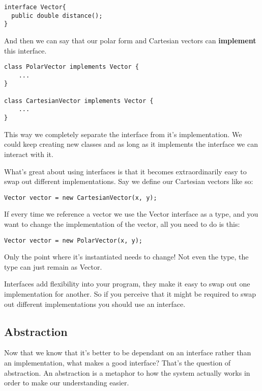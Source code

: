 \documentclass{article}
\begin{document}
  \begin{verbatim}
interface Vector{
  public double distance();
}
  \end{verbatim}

  And then we can say that our polar form and Cartesian vectors can \textbf{implement}
  this interface.

  \begin{verbatim}
class PolarVector implements Vector {
    ...
}

class CartesianVector implements Vector {
    ...
}
  \end{verbatim}

  This way we completely separate the interface from it's implementation. We
  could keep creating new classes and as long as it implements the interface
  we can interact with it.
  
  What's great about using interfaces is that it becomes extraordinarily easy
  to swap out different implementations. Say we define our Cartesian vectors
  like so:

  \begin{verbatim}
Vector vector = new CartesianVector(x, y);
  \end{verbatim}

  If every time we reference a vector we use the Vector interface as a type,
  and you want to change the implementation of the vector, all you need to do
  is this:

  \begin{verbatim}
Vector vector = new PolarVector(x, y);
  \end{verbatim}

  Only the point where it's instantiated needs to change! Not even the type,
  the type can just remain as Vector.

  Interfaces add flexibility into your program, they make it easy to swap out
  one implementation for another. So if you perceive that it might be required
  to swap out different implementations you should use an interface.

  \subsection*{Abstraction}
  Now that we know that it's better to be dependant on an interface rather 
  than an implementation, what makes a good interface? That's the question of
  abstraction. An abstraction is a metaphor to how the system actually works
  in order to make our understanding easier.
\end{document}

